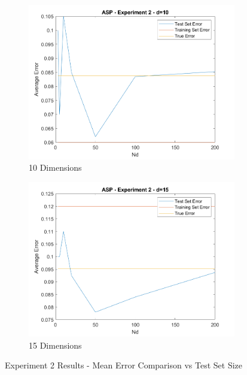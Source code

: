 \begin{figure}[h]
	\centering
	\begin{subfigure}{.5\textwidth}
		\centering
		\includegraphics[width=.95\linewidth]{./code/Exp2-results/ErrorComparison_10.png}
		\caption{10 Dimensions}
	\end{subfigure}%
	\begin{subfigure}{.5\textwidth}
		\centering
		\includegraphics[width=.95\linewidth]{./code/Exp2-results/ErrorComparison_15.png}
		\caption{15 Dimensions}
	\end{subfigure}
	\caption{Experiment 2 Results - Mean Error Comparison vs Test Set Size}
	\label{fig:exp2-b}
\end{figure}
